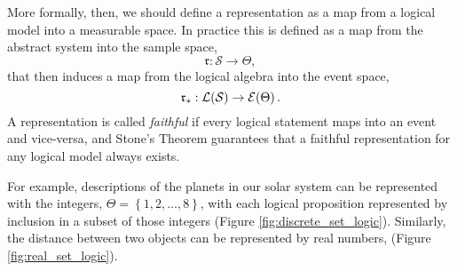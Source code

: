 More formally, then, we should define a representation as a map from 
a logical model into a measurable space.  In practice this is defined 
as a map from the abstract system into the sample space,
%
\begin{equation*}
\mathfrak{r} : \mathcal{S} \rightarrow \Theta,
\end{equation*}
%
that then induces a map from the logical algebra into the event space,
%
\begin{equation*}
\mathfrak{r}_{*} : 
\mathcal{L} \! \left( \mathcal{S} \right) \rightarrow  \mathcal{E} \! \left( \Theta \right) .
\end{equation*}
%
A representation is called \emph{faithful} if every logical statement maps 
into an event and vice-versa, and Stone's Theorem guarantees that a
faithful representation for any logical model always exists.

For example, descriptions of the planets in our solar system can be 
represented with the integers, $\Theta = \left\{1, 2, \ldots, 8 \right\}$, 
with each logical proposition represented by inclusion in a subset of 
those integers (Figure \ref{fig:discrete_set_logic}).  Similarly, the 
distance between two objects can be represented by real numbers,
(Figure \ref{fig:real_set_logic}).

